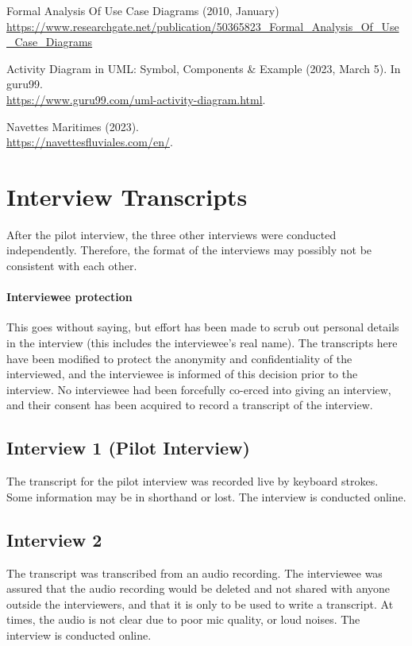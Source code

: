 \documentclass[letterpaper]{report}
\begin{document}
\begin{thebibliography}{9}
Formal Analysis Of Use Case Diagrams (2010, January)
\url{https://www.researchgate.net/publication/50365823_Formal_Analysis_Of_Use_Case_Diagrams}

Activity Diagram in UML: Symbol, Components \& Example (2023, March 5). In guru99.\\
\url{https://www.guru99.com/uml-activity-diagram.html}.

Navettes Maritimes (2023).\\
\url{https://navettesfluviales.com/en/}.

\end{thebibliography}

\appendix

\chapter{Interview Transcripts} \label{sec:Appendix_Interviews}
After the pilot interview, the three other interviews were conducted independently. Therefore, the format of the interviews may possibly not be consistent with each other. 
\subsubsection{Interviewee protection}
This goes without saying, but effort has been made to scrub out personal details in the interview (this includes the interviewee's real name). The transcripts here have been modified to protect the anonymity and confidentiality of the interviewed, and the interviewee is informed of this decision prior to the interview. No interviewee had been forcefully co-erced into giving an interview, and their consent has been acquired to record a transcript of the interview.

\section{Interview 1 (Pilot Interview)}
The transcript for the pilot interview was recorded live by keyboard strokes. Some information may be in shorthand or lost. The interview is conducted online.

\vspace{\baselineskip}
\noindent 

\newpage
\section{Interview 2}
The transcript was transcribed from an audio recording. The interviewee was assured that the audio recording would be deleted and not shared with anyone outside the interviewers, and that it is only to be used to write a transcript. At times, the audio is not clear due to poor mic quality, or loud noises. The interview is conducted online.
\end{document}
